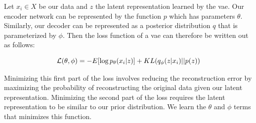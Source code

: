 Let $x_i \in X$ be our data and $z$ the latent representation learned by the \gls{vae}.
Our encoder network can be represented by the function $p$ which has parameters $\theta$.
Similarly, our decoder can be represented as a posterior distribution $q$ that is parameterized by $\phi$.
Then the loss function of a \gls{vae} can therefore be written out as follows:

\begin{equation}\label{eqn:vae-loss}
\mathcal{L}(\theta, \phi) = - E[\log p_{\theta}(x_i | z)] + KL(q_{\phi}(z | x_i) || p(z)) \\
\end{equation}

Minimizing this first part of the loss involves reducing the reconstruction error by maximizing the probability of reconstructing the original data given our latent representation.
Minimizing the second part of the loss requires the latent representation to be similar to our prior distribution.
We learn the $\theta$ and $\phi$ terms that minimizes this function.
